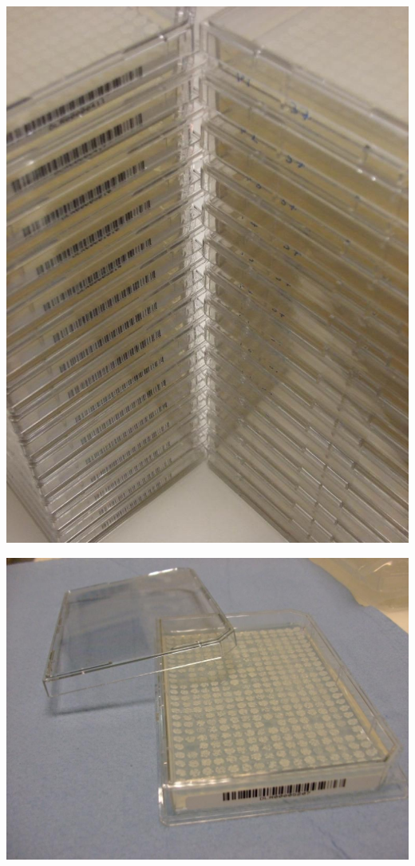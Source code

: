 \documentclass[mathserif,handout]{beamer}
\begin{document}
{{\includegraphics[height=0.4\textheight]{figs/robots-plates}
}
\vspace{0.5ex}
\centerline{
\includegraphics[height=0.4\textheight]{figs/robots-plate}~
}}
\end{document}
